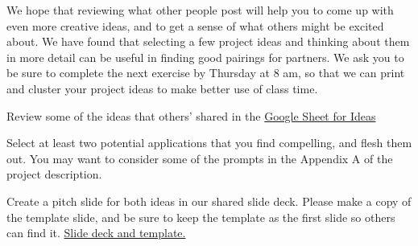 \documentclass[assignment08_Solutions]{subfiles}
\begin{document}
\vspace{1em}
We hope that reviewing what other people post will help you to come up with even more creative ideas, and to get a sense of what others might be excited about. We have found that selecting a few project ideas and thinking about them in more detail can be useful in finding good pairings for partners. We ask you to be sure to complete the next exercise by Thursday at 8 am, so that we can print and cluster your project ideas to make better use of class time.
\vspace{1em}
\begin{exercise}
\bes
\item Review some of the ideas that others' shared in the \href{https://docs.google.com/spreadsheets/d/1TyzKsfdCvZEzfaYswfJSHiYH2JU73gd0KCIOwQijvFo/edit?usp=sharing}{Google Sheet for Ideas} 
\item Select at least two potential applications that you find compelling, and flesh them out. You may want to consider some of the prompts in the Appendix A of the project description.
\item Create a pitch slide for both ideas in our shared slide deck. Please make a copy of the template slide, and be sure to keep the template as the first slide so others can find it. \href{https://docs.google.com/presentation/d/1f3u9lJXV9_DzKRhHH41kr8h3xQn4ex6SbpcNwyws9z4/edit?usp=sharing}{Slide deck and template.} 
\ees
\end{exercise}
\end{document}
